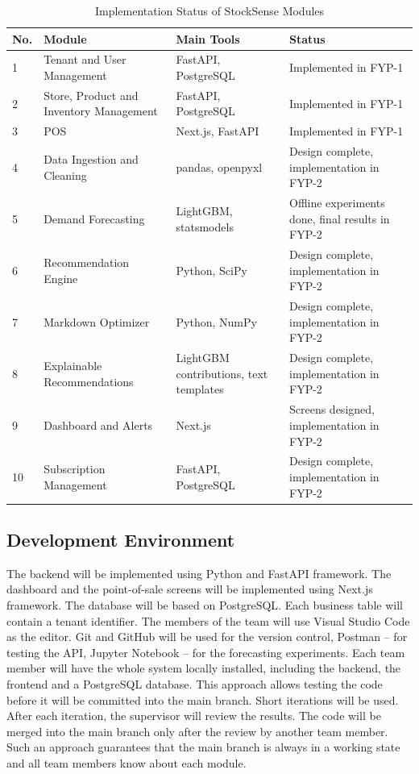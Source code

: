 \documentclass{StockSense}
\begin{document}
\begin{table}[!htbp]
\centering
\caption{Implementation Status of StockSense Modules}
\label{tab:impl-status}
\begin{tabular}{|l|p{4.2cm}|p{3.8cm}|p{3.6cm}|}
\hline
\textbf{No.} & \textbf{Module} & \textbf{Main Tools} & \textbf{Status} \\ \hline
1 & Tenant and User Management & FastAPI, PostgreSQL & Implemented in FYP-1 \\ \hline
2 & Store, Product and Inventory Management & FastAPI, PostgreSQL & Implemented in FYP-1 \\ \hline
3 & POS & Next.js, FastAPI & Implemented in FYP-1 \\ \hline
4 & Data Ingestion and Cleaning & pandas, openpyxl & Design complete, implementation in FYP-2 \\ \hline
5 & Demand Forecasting & LightGBM, statsmodels & Offline experiments done, final results in FYP-2 \\ \hline
6 & Recommendation Engine & Python, SciPy & Design complete, implementation in FYP-2 \\ \hline
7 & Markdown Optimizer & Python, NumPy & Design complete, implementation in FYP-2 \\ \hline
8 & Explainable Recommendations & LightGBM contributions, text templates & Design complete, implementation in FYP-2 \\ \hline
9 & Dashboard and Alerts & Next.js & Screens designed, implementation in FYP-2 \\ \hline
10 & Subscription Management & FastAPI, PostgreSQL & Design complete, implementation in FYP-2 \\ \hline
\end{tabular}
\end{table}

\subsection{Development Environment}

The backend will be implemented using Python and FastAPI framework. The dashboard and the point-of-sale screens will be implemented using Next.js framework. The database will be based on PostgreSQL. Each business table will contain a tenant identifier. The members of the team will use Visual Studio Code as the editor. Git and GitHub will be used for the version control, Postman – for testing the API, Jupyter Notebook – for the forecasting experiments. Each team member will have the whole system locally installed, including the backend, the frontend and a PostgreSQL database. This approach allows testing the code before it will be committed into the main branch. Short iterations will be used. After each iteration, the supervisor will review the results. The code will be merged into the main branch only after the review by another team member. Such an approach guarantees that the main branch is always in a working state and all team members know about each module.
\end{document}
